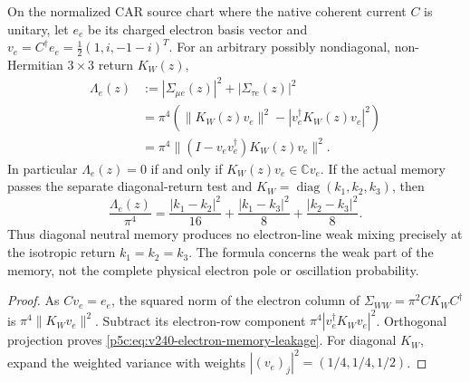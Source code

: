 \documentclass[12pt,a4paper]{article}
\begin{document}
\begin{theorem}
\label{p5c:thm:v240-electron-memory-variance}
On the normalized CAR source chart where the native coherent current
$C$ is unitary, let $e_e$ be its charged electron basis vector and
$v_e=C^\dagger e_e=\tfrac12(1,i,-1-i)^T$. For an arbitrary
possibly nondiagonal, non-Hermitian $3\times3$ return $K_W(z)$,
\begin{equation}\label{p5c:eq:v240-electron-memory-leakage}
\boxed{\begin{aligned}
 \Lambda_e(z)&:=|\Sigma_{\mu e}(z)|^2+|\Sigma_{\tau e}(z)|^2\\
 &=\pi^4\left(\|K_W(z)v_e\|^2
             -|v_e^\dagger K_W(z)v_e|^2\right)\\
 &=\pi^4\|(I-v_ev_e^\dagger)K_W(z)v_e\|^2.
\end{aligned}}
\end{equation}
In particular $\Lambda_e(z)=0$ if and only if
$K_W(z)v_e\in\mathbb Cv_e$. If the actual memory passes the
separate diagonal-return test and
$K_W=\operatorname{diag}(k_1,k_2,k_3)$, then
\begin{equation}\label{p5c:eq:v240-electron-memory-pair-differences}
 \boxed{\frac{\Lambda_e(z)}{\pi^4}
 =\frac{|k_1-k_2|^2}{16}
  +\frac{|k_1-k_3|^2}{8}
  +\frac{|k_2-k_3|^2}{8}.}
\end{equation}
Thus diagonal neutral memory produces no electron-line weak mixing
precisely at the isotropic return $k_1=k_2=k_3$.
The formula concerns the weak part of the memory, not the complete
physical electron pole or oscillation probability.
\end{theorem}
\begin{proof}
As $Cv_e=e_e$, the squared norm of the electron column of
$\Sigma_{WW}=\pi^2CK_WC^\dagger$ is
$\pi^4\|K_Wv_e\|^2$. Subtract its electron-row component
$\pi^4|v_e^\dagger K_Wv_e|^2$. Orthogonal projection proves
\eqref{p5c:eq:v240-electron-memory-leakage}. For diagonal $K_W$,
expand the weighted variance with weights
$|(v_e)_j|^2=(1/4,1/4,1/2)$.
\end{proof}
\end{document}

